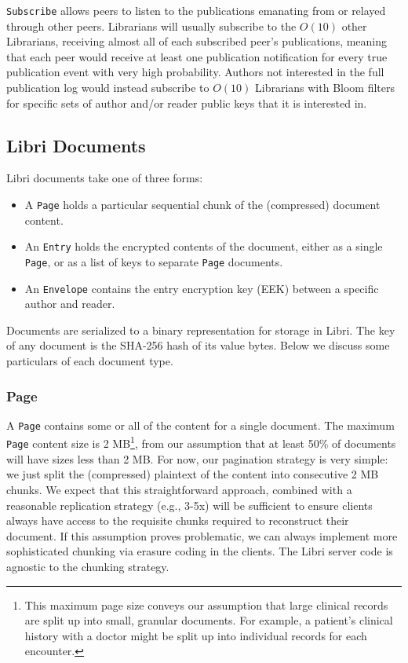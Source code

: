 \documentclass[10pt]{article}
\newcommand{\ttt}[1]{\texttt{#1}}
\def\Entry{\ttt{Entry}}
\def\Page{\ttt{Page}}
\def\Envelope{\ttt{Envelope}}
\begin{document}
\ttt{Subscribe} allows peers to listen to the publications emanating from or relayed through other peers. Librarians will usually subscribe to the $O(10)$ other Librarians, receiving almost all of each subscribed peer's publications, meaning that each peer would receive at least one publication notification for every true publication event with very high probability. Authors not interested in the full publication log would instead subscribe to $O(10)$ Librarians with Bloom filters for specific sets of author and/or reader public keys that it is interested in.

\subsection{Libri Documents}
\label{sec:Docs}
Libri documents take one of three forms:
\begin{itemize}
	\item A \Page{} holds a particular sequential chunk of the (compressed) document content. 
	\item An \Entry{} holds the encrypted contents of the document, either as a single \Page{}, or as a list of keys to separate \Page{} documents.
	\item An \Envelope{} contains the entry encryption key (EEK) between a specific author and reader.
\end{itemize}
Documents are serialized to a binary representation for storage in Libri. The key of any document is the SHA-256 hash of its value bytes. Below we discuss some particulars of each document type.

\subsubsection{Page}
A \Page{} contains some or all of the content for a single document. The maximum \Page {} content size is 2 MB\footnote{This maximum page size conveys our assumption that large clinical records are split up into small, granular documents. For example, a patient's clinical history with a doctor might be split up into individual records for each encounter.}, from our assumption that at least 50\% of documents will have sizes less than 2 MB. For now, our pagination strategy is very simple: we just split the (compressed) plaintext of the content into consecutive 2 MB chunks. We expect that this straightforward approach, combined with a reasonable replication strategy (e.g., 3-5x) will be sufficient to ensure clients always have access to the requisite chunks required to reconstruct their document. If this assumption proves problematic, we can always implement more sophisticated chunking via erasure coding in the clients. The Libri server code is agnostic to the chunking strategy.
\end{document}
